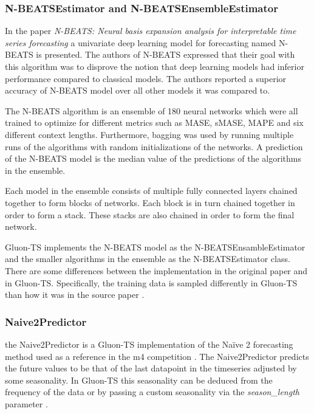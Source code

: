 \subsubsection{N-BEATSEstimator and N-BEATSEnsembleEstimator}
\label{algo:nbeats}
In the paper \textit{N-BEATS: Neural basis expansion analysis for interpretable time series forecasting} \cite{oreshkin_n_beats_2020} a univariate deep learning model for forecasting named N-BEATS is presented. The authors of N-BEATS expressed that their goal with this algorithm was to disprove the notion that deep learning models had inferior performance compared to classical models. The authors reported a superior accuracy of N-BEATS model over all other models it was compared to.

The N-BEATS algorithm is an ensemble of 180 neural networks which were all trained to optimize for different metrics such as MASE, sMASE, MAPE and six different context lengths. Furthermore, bagging was used by running multiple runs of the algorithms with random initializations of the networks. A prediction of the N-BEATS model is the median value of the predictions of the algorithms in the ensemble.

Each model in the ensemble consists of multiple fully connected layers chained together to form blocks of networks. Each block is in turn chained together in order to form a stack. These stacks are also chained in order to form the final network.

Gluon-TS implements the N-BEATS model as the N-BEATSEnsambleEstimator and the smaller algorithms in the ensemble as the N-BEATSEstimator class. There are some differences between the implementation in the original paper and in Gluon-TS. Specifically, the training data is sampled differently in Gluon-TS than how it was in the source paper \cite{gluonts-website}.

\subsubsection{Naive2Predictor}
\label{model:naive2}
the Naive2Predictor is a Gluon-TS implementation of the Naïve 2 forecasting method used as a reference in the m4 competition \cite{makridakis_m4_2020}. The Naive2Predictor predicts the future values to be that of the last datapoint in the timeseries adjusted by some seasonality. In Gluon-TS this seasonality can be deduced from the frequency of the data or by passing a custom seasonality via the \textit{season\_length} parameter \cite{gluonts-website}.

